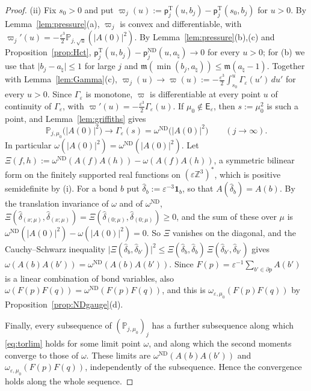 \documentclass[11pt]{amsart}
\theoremstyle{plain}
\theoremstyle{definition}
\theoremstyle{remark}
\numberwithin{equation}{section}
\newcommand{\Z}{\mathbb{Z}}
\newcommand{\eps}{\varepsilon}
\newcommand{\abs}[1]{\lvert #1\rvert}
\begin{document}
\begin{proof}
(ii) Fix $s_0>0$ and put $\varpi_j(u):=\mathsf p^{\mathrm T}_j(u,b_j)-\mathsf p^{\mathrm T}_j(s_0,b_j)$ for $u>0$. By Lemma~\ref{lem:pressure}(a), $\varpi_j$ is convex and differentiable, with $\varpi_j'(u)=-\frac{\eps^3}2\mathbb P_{j,\sqrt u}(\abs{A(0)}^2)$. By Lemma~\ref{lem:pressure}(b),(c) and Proposition~\ref{prop:Hct}, $\mathsf p^{\mathrm T}_j(u,b_j)-\mathsf p^{\mathrm{ND}}_j(u,a_\natural)\to0$ for every $u>0$; for (b) we use that $\abs{b_j-a_\natural}\le1$ for large $j$ and $\mathfrak m(\min(b_j,a_\natural))\le\mathfrak m(a_\natural-1)$. Together with Lemma~\ref{lem:Gamma}(c), $\varpi_j(u)\to\varpi(u):=-\frac{\eps^3}2\int_{s_0}^u\Gamma_\eps(u')\,du'$ for every $u>0$. Since $\Gamma_\eps$ is monotone, $\varpi$ is differentiable at every point $u$ of continuity of $\Gamma_\eps$, with $\varpi'(u)=-\frac{\eps^3}2\Gamma_\eps(u)$. If $\mu_0\notin\mathsf E_\eps$, then $s:=\mu_0^2$ is such a point, and Lemma~\ref{lem:griffiths} gives
\[
\mathbb P_{j,\mu_0}\big(\abs{A(0)}^2\big)\to\Gamma_\eps(s)=\omega^{\mathrm{ND}}\big(\abs{A(0)}^2\big)\qquad(j\to\infty).
\]
In particular $\omega(\abs{A(0)}^2)=\omega^{\mathrm{ND}}(\abs{A(0)}^2)$. Let $\Xi(f,h):=\omega^{\mathrm{ND}}(A(f)A(h))-\omega(A(f)A(h))$, a symmetric bilinear form on the finitely supported real functions on $(\eps\Z^3)^*$, which is positive semidefinite by (i). For a bond $b$ put $\hat\delta_b:=\eps^{-3}\mathbf 1_b$, so that $A(\hat\delta_b)=A(b)$. By the translation invariance of $\omega$ and of $\omega^{\mathrm{ND}}$, $\Xi(\hat\delta_{(x;\mu)},\hat\delta_{(x;\mu)})=\Xi(\hat\delta_{(0;\mu)},\hat\delta_{(0;\mu)})\ge0$, and the sum of these over $\mu$ is $\omega^{\mathrm{ND}}(\abs{A(0)}^2)-\omega(\abs{A(0)}^2)=0$. So $\Xi$ vanishes on the diagonal, and the Cauchy--Schwarz inequality $\abs{\Xi(\hat\delta_b,\hat\delta_{b'})}^2\le\Xi(\hat\delta_b,\hat\delta_b)\,\Xi(\hat\delta_{b'},\hat\delta_{b'})$ gives $\omega(A(b)A(b'))=\omega^{\mathrm{ND}}(A(b)A(b'))$. Since $F(p)=\eps^{-1}\sum_{b'\in\partial p}A(b')$ is a linear combination of bond variables, also $\omega(F(p)F(q))=\omega^{\mathrm{ND}}(F(p)F(q))$, and this is $\omega_{\eps,\mu_0}(F(p)F(q))$ by Proposition~\ref{prop:NDgauge}(d).

Finally, every subsequence of $(\mathbb P_{j,\mu_0})_j$ has a further subsequence along which \eqref{eq:torlim} holds for some limit point $\omega$, and along which the second moments converge to those of $\omega$. These limits are $\omega^{\mathrm{ND}}(A(b)A(b'))$ and $\omega_{\eps,\mu_0}(F(p)F(q))$, independently of the subsequence. Hence the convergence holds along the whole sequence.
\end{proof}
\end{document}
